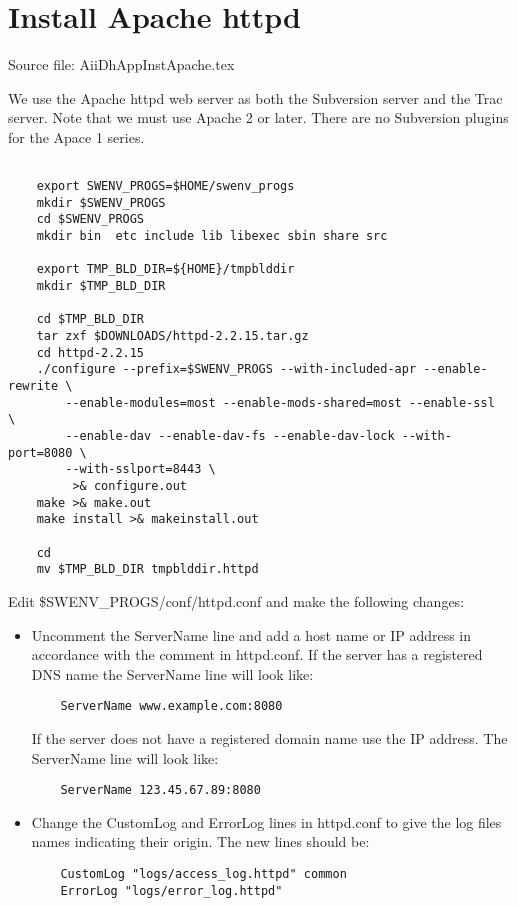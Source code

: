 
\section{Install Apache httpd}

Source file: AiiDhAppInstApache.tex

We use the Apache httpd web server as both the Subversion server
and the Trac server.  Note that we must use Apache 2 or
later.  There are no Subversion plugins for the Apace 1
series.

\begin{verbatim}

    export SWENV_PROGS=$HOME/swenv_progs
    mkdir $SWENV_PROGS
    cd $SWENV_PROGS
    mkdir bin  etc include lib libexec sbin share src

    export TMP_BLD_DIR=${HOME}/tmpblddir
    mkdir $TMP_BLD_DIR

    cd $TMP_BLD_DIR
    tar zxf $DOWNLOADS/httpd-2.2.15.tar.gz
    cd httpd-2.2.15
    ./configure --prefix=$SWENV_PROGS --with-included-apr --enable-rewrite \
        --enable-modules=most --enable-mods-shared=most --enable-ssl  \
        --enable-dav --enable-dav-fs --enable-dav-lock --with-port=8080 \
        --with-sslport=8443 \
         >& configure.out
    make >& make.out
    make install >& makeinstall.out

    cd
    mv $TMP_BLD_DIR tmpblddir.httpd

\end{verbatim}

Edit \$SWENV\_PROGS/conf/httpd.conf and make the following
changes:
\begin{itemize}

\item
Uncomment the ServerName line and add
a host name or IP address in accordance with the comment in httpd.conf.
If the server has a registered DNS name the ServerName line will look
like:
\begin{verbatim}
    ServerName www.example.com:8080
\end{verbatim}
If the server does not have a registered domain name use the IP address.
The ServerName line will look like:
\begin{verbatim}
    ServerName 123.45.67.89:8080
\end{verbatim}

\item
Change the CustomLog and ErrorLog lines in httpd.conf to
give the log files names indicating their origin.  The new 
lines should be:
\begin{verbatim}
    CustomLog "logs/access_log.httpd" common
    ErrorLog "logs/error_log.httpd"
\end{verbatim}

\end{itemize}


